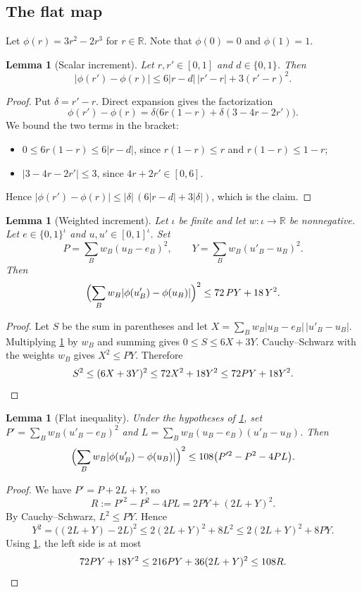\documentclass[11pt]{article}
\newtheorem{lemma}[theorem]{Lemma}
\theoremstyle{definition}
\theoremstyle{remark}
\newcommand{\R}{\mathbb{R}}
\begin{document}
\subsection{The flat map}

Let $\phi(r)=3r^2-2r^3$ for $r\in\R$. Note that $\phi(0)=0$ and $\phi(1)=1$.

\begin{lemma}[Scalar increment]\label{lem:flat_scalar}
Let $r,r'\in[0,1]$ and $d\in\{0,1\}$. Then
\[
|\phi(r')-\phi(r)|\le6|r-d|\,|r'-r|+3(r'-r)^2 .
\]
\end{lemma}
\begin{proof}
Put $\delta=r'-r$. Direct expansion gives the factorization
\[
\phi(r')-\phi(r)=\delta\bigl(6r(1-r)+\delta(3-4r-2r')\bigr).
\]
We bound the two terms in the bracket:
\begin{itemize}
\item $0\le 6r(1-r)\le 6|r-d|$, since $r(1-r)\le r$ and $r(1-r)\le1-r$;
\item $|3-4r-2r'|\le3$, since $4r+2r'\in[0,6]$.
\end{itemize}
Hence $|\phi(r')-\phi(r)|\le|\delta|\,(6|r-d|+3|\delta|)$, which is the claim.
\end{proof}

\begin{lemma}[Weighted increment]\label{lem:flat_increment}
Let $\iota$ be finite and let $w:\iota\to\R$ be nonnegative. Let $e\in\{0,1\}^\iota$ and $u,u'\in[0,1]^\iota$. Set
\[
P=\sum_Bw_B(u_B-e_B)^2,\qquad Y=\sum_Bw_B(u'_B-u_B)^2 .
\]
Then
\[
\Bigl(\sum_Bw_B|\phi(u'_B)-\phi(u_B)|\Bigr)^2\le72\,PY+18\,Y^2 .
\]
\end{lemma}
\begin{proof}
Let $S$ be the sum in parentheses and let $X=\sum_Bw_B|u_B-e_B|\,|u'_B-u_B|$. Multiplying \cref{lem:flat_scalar} by $w_B$ and summing gives $0\le S\le6X+3Y$. Cauchy--Schwarz with the weights $w_B$ gives $X^2\le PY$. Therefore
\[
S^2\le(6X+3Y)^2\le72X^2+18Y^2\le72PY+18Y^2. \qedhere
\]
\end{proof}

\begin{lemma}[Flat inequality]\label{lem:flat_ineq}
Under the hypotheses of \cref{lem:flat_increment}, set $P'=\sum_Bw_B(u'_B-e_B)^2$ and $L=\sum_Bw_B(u_B-e_B)(u'_B-u_B)$. Then
\[
\Bigl(\sum_Bw_B|\phi(u'_B)-\phi(u_B)|\Bigr)^2\le108\bigl(P'^2-P^2-4PL\bigr).
\]
\end{lemma}
\begin{proof}
We have $P'=P+2L+Y$, so
\[
R:=P'^2-P^2-4PL=2PY+(2L+Y)^2 .
\]
By Cauchy--Schwarz, $L^2\le PY$. Hence
\[
Y^2=\bigl((2L+Y)-2L\bigr)^2\le2(2L+Y)^2+8L^2\le2(2L+Y)^2+8PY .
\]
Using \cref{lem:flat_increment}, the left side is at most
\[
72PY+18Y^2\le216PY+36(2L+Y)^2\le108R. \qedhere
\]
\end{proof}
\end{document}
